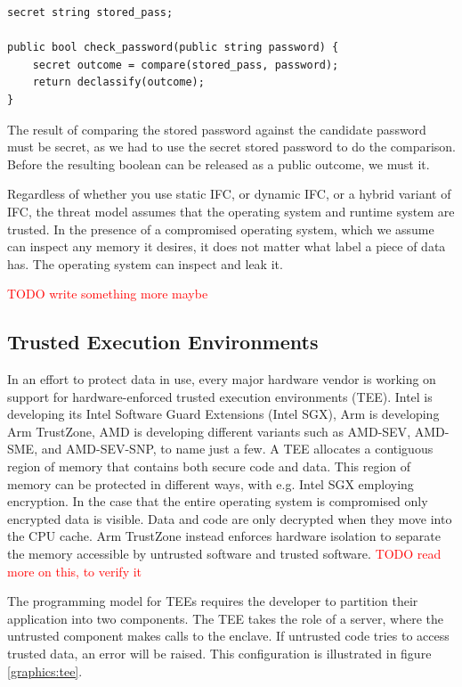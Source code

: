 \begin{verbatim}
secret string stored_pass;

public bool check_password(public string password) {
    secret outcome = compare(stored_pass, password);
    return declassify(outcome);
}
\end{verbatim}

The result of comparing the stored password against the candidate password must be secret, as we had to use the secret stored
password to do the comparison. Before the resulting boolean can be released as a public outcome, we must
 it.

Regardless of whether you use static IFC, or dynamic IFC, or a hybrid variant of IFC, the threat model assumes that the
operating system and runtime system are trusted. In the presence of a compromised operating system, which we assume can
inspect any memory it desires, it does not matter what label a piece of data has. The operating system can inspect and
leak it.

\textcolor{red}{TODO write something more maybe}

\subsection{Trusted Execution Environments}

In an effort to protect data in use, every major hardware vendor is working on support for hardware-enforced trusted
execution environments (TEE). Intel is developing its Intel Software Guard Extensions (Intel SGX)\cite{intelsgx}, Arm is
developing Arm TrustZone\cite{armtz}, AMD is developing different variants such as AMD-SEV\cite{amdsev}, AMD-SME, and
AMD-SEV-SNP, to name just a few. A TEE allocates a contiguous region of memory that contains both secure code and data.
This region of memory can be protected in different ways, with e.g. Intel SGX employing encryption. In the case that the
entire operating system is compromised only encrypted data is visible. Data and code are only decrypted when they move into the
CPU cache. Arm TrustZone instead enforces hardware isolation to separate the memory accessible by untrusted software and
trusted software. \textcolor{red}{TODO read more on this, to verify it}

The programming model for TEEs requires the developer to partition their application into two components. The TEE takes
the role of a server, where the untrusted component makes calls to the enclave. If untrusted code tries to access trusted
data, an error will be raised. This configuration is illustrated in figure \ref{graphics:tee}.

